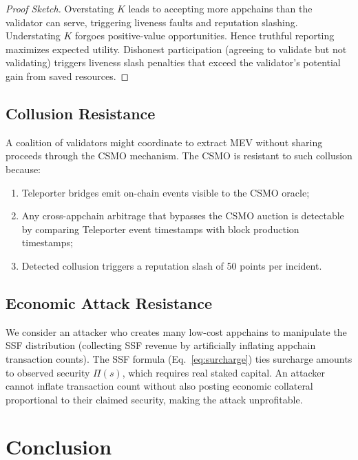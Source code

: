 \documentclass[11pt]{article}
\begin{document}
\begin{proof}[Proof Sketch]
Overstating $K$ leads to accepting more appchains than the validator can serve, triggering
liveness faults and reputation slashing. Understating $K$ forgoes positive-value
opportunities. Hence truthful reporting maximizes expected utility. Dishonest participation
(agreeing to validate but not validating) triggers liveness slash penalties that exceed
the validator's potential gain from saved resources.
\end{proof}

\subsection{Collusion Resistance}

A coalition of validators might coordinate to extract MEV without sharing proceeds
through the CSMO mechanism. The CSMO is resistant to such collusion because:

\begin{enumerate}[leftmargin=1.5em]
  \item Teleporter bridges emit on-chain events visible to the CSMO oracle;
  \item Any cross-appchain arbitrage that bypasses the CSMO auction is detectable by
    comparing Teleporter event timestamps with block production timestamps;
  \item Detected collusion triggers a reputation slash of 50 points per incident.
\end{enumerate}

\subsection{Economic Attack Resistance}

We consider an attacker who creates many low-cost appchains to manipulate the SSF
distribution (collecting SSF revenue by artificially inflating appchain transaction counts).
The SSF formula (Eq.~\ref{eq:surcharge}) ties surcharge amounts to observed security
$\Pi(s)$, which requires real staked capital. An attacker cannot inflate transaction
count without also posting economic collateral proportional to their claimed security,
making the attack unprofitable.

\section{Conclusion}
\end{document}
